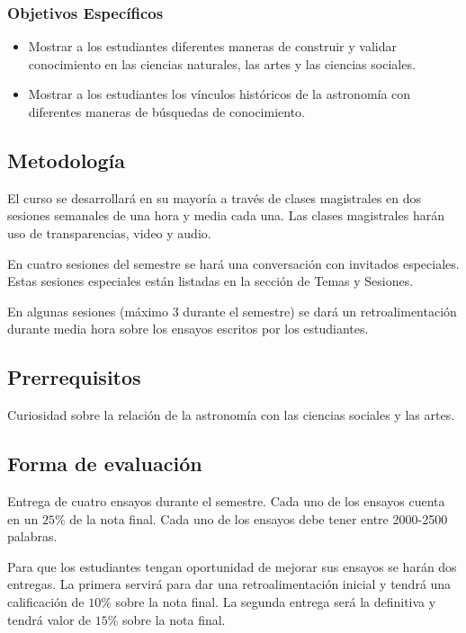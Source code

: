 \documentclass[12pt]{report}
\begin{document}
\subsubsection*{Objetivos Espec\'ificos}
\begin{itemize}
\item Mostrar a los estudiantes diferentes maneras de construir
  y validar conocimiento en las ciencias naturales, las artes y las
  ciencias sociales. 
\item Mostrar a los estudiantes los v\'inculos hist\'oricos de la
  astronom\'ia con diferentes maneras de b\'usquedas de conocimiento. 
\end{itemize}

\subsection*{Metodolog\'ia}

El curso se desarrollar\'a en su mayor\'ia a trav\'es de clases
magistrales en dos sesiones semanales de una hora y media cada
una. 
Las clases magistrales har\'an uso de transparencias, video y
audio. 

En cuatro sesiones del semestre se har\'a una conversaci\'on con
invitados especiales. 
Estas sesiones especiales est\'an listadas en la
secci\'on de Temas y Sesiones.  

En algunas sesiones (m\'aximo 3 durante el semestre) se dar\'a un
retroalimentaci\'on durante media hora sobre los ensayos escritos por los
estudiantes. 

\subsection*{Prerrequisitos}
Curiosidad sobre la relaci\'on de la astronom\'ia con las ciencias
sociales y las artes.

\subsection*{Forma de evaluaci\'on}

Entrega de cuatro ensayos durante el semestre. Cada uno de los ensayos
cuenta en un $25 \%$ de la nota final. Cada uno de los ensayos debe
tener entre 2000-2500 palabras.  

Para que los estudiantes tengan oportunidad de mejorar sus ensayos se
har\'an dos entregas. La primera servir\'a para dar una
retroalimentaci\'on inicial y tendr\'a una calificaci\'on de $10\%$
sobre la nota final. La segunda entrega ser\'a la definitiva y
tendr\'a  valor de $15\%$ sobre la nota final. 
 
\end{document}
